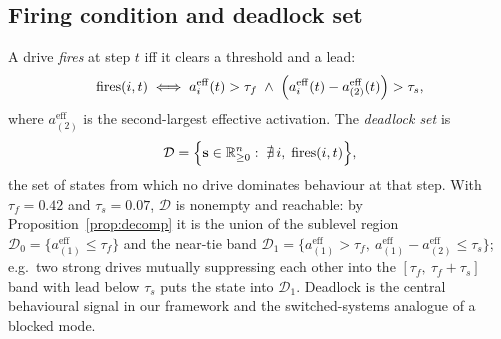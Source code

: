 \documentclass[journal]{IEEEtran}
\newcommand{\R}{\mathbb{R}}
\newcommand{\DD}{\mathcal{D}}
\newcommand{\bs}{\mathbf{s}}
\begin{document}
\subsection{Firing condition and deadlock set}
A drive \emph{fires} at step $t$ iff it clears a threshold and a lead:
\begin{equation}
\label{eq:fire}
\mathrm{fires}(i,t) \iff a_i^{\mathrm{eff}}(t) > \tau_f\;\wedge\;
\Bigl(a_i^{\mathrm{eff}}(t) - a_{(2)}^{\mathrm{eff}}(t)\Bigr) >
\tau_s,
\end{equation}
where $a_{(2)}^{\mathrm{eff}}$ is the second-largest effective activation.
The \emph{deadlock set} is
\begin{equation}
\label{eq:deadlock}
\DD=\Bigl\{\bs\in\R_{\ge0}^{n}:\; \nexists\, i,\; \mathrm{fires}(i,t)\Bigr\},
\end{equation}
the set of states from which no drive dominates behaviour at that step.
With $\tau_f=0.42$ and $\tau_s=0.07$, $\DD$ is nonempty and reachable:
by Proposition~\ref{prop:decomp} it is the union of the sublevel region
$\DD_0=\{a_{(1)}^{\mathrm{eff}}\le\tau_f\}$ and the near-tie band
$\DD_1=\{a_{(1)}^{\mathrm{eff}}>\tau_f,\ a_{(1)}^{\mathrm{eff}}-a_{(2)}^{\mathrm{eff}}\le\tau_s\}$;
e.g.\ two strong drives mutually suppressing each other into the
$[\tau_f,\ \tau_f+\tau_s]$ band with lead below $\tau_s$ puts the state
into $\DD_1$. Deadlock is the central behavioural signal in our
framework and the switched-systems analogue of a blocked mode.
\end{document}
